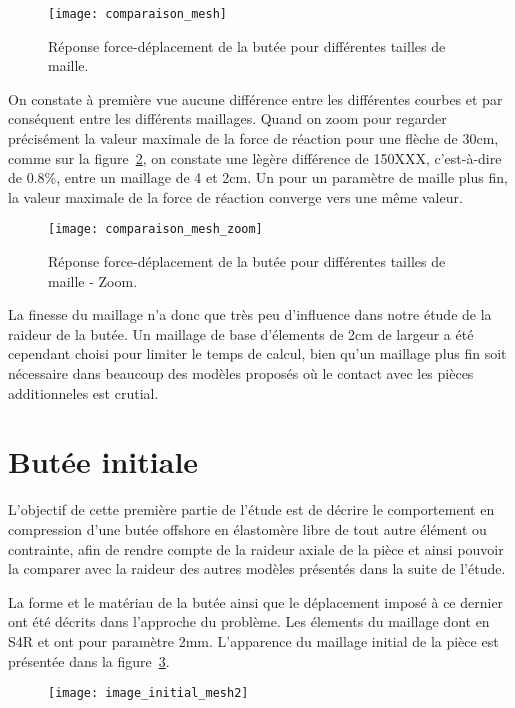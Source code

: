 ﻿ \documentclass{article}
\begin{document}
\begin{figure}[!h]
	\centering
	\texttt{[image: comparaison\_mesh]}
	\caption{Réponse force-déplacement de la butée pour différentes tailles de maille.}
	\label{fig1}
\end{figure}


On constate à première vue aucune différence entre les différentes courbes et par conséquent entre les différents maillages. Quand on zoom pour regarder précisément la valeur maximale de la force de réaction pour une flèche de 30cm, comme sur la figure~\ref{fig2}, on constate une lègère différence de 150XXX, c'est-à-dire de 0.8\%, entre un maillage de 4 et 2cm. Un pour un paramètre de maille plus fin, la valeur maximale de la force de réaction converge vers une même valeur.

\begin{figure}[!h]
	\centering
	\texttt{[image: comparaison\_mesh\_zoom]}
	\caption{Réponse force-déplacement de la butée pour différentes tailles de maille - Zoom.}
	\label{fig2}
\end{figure}

La finesse du maillage n'a donc que très peu d'influence dans notre étude de la raideur de la butée. Un maillage de base d'élements de 2cm de largeur a été cependant choisi pour limiter le temps de calcul, bien qu'un maillage plus fin soit nécessaire dans beaucoup des modèles proposés où le contact avec les pièces additionneles est crutial.


\section{Butée initiale}

L'objectif de cette première partie de l'étude est de décrire le comportement en compression d'une butée offshore en élastomère libre de tout autre élément ou contrainte, afin de rendre compte de la raideur axiale de la pièce et ainsi pouvoir la comparer avec la raideur des autres modèles présentés dans la suite de l'étude.

La forme et le matériau de la butée ainsi que le déplacement imposé à ce dernier ont été décrits dans l'approche du problème. Les élements du maillage dont en S4R et ont pour paramètre 2mm. L'apparence du maillage initial de la pièce est présentée dans la figure~\ref{fig3}.

\begin{figure}[!h]
	\centering
	\texttt{[image: image\_initial\_mesh2]}
	\caption{Visuel du maillage appliqué à la butée initiale.}
	\label{fig3}
\end{figure}
\end{document}
